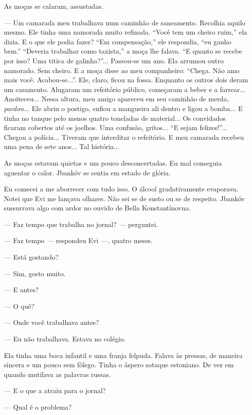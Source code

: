 As moças se calaram, assustadas.

\emph{---} Um camarada meu trabalhava num caminhão de saneamento.
Recolhia aquilo mesmo. Ele tinha uma namorada muito refinada. ``Você tem
um cheiro ruim,'' ela dizia. E o que ele podia fazer? ``Em
compensação,'' ele respondia, ``eu ganho bem.'' ``Deveria trabalhar como
taxista,'' a moça lhe falava. ``E quanto se recebe por isso? Uma titica
de galinha?''... Passou-se um ano. Ela arrumou outro namorado. Sem
cheiro. E a moça disse ao meu companheiro: ``Chega. Não amo mais você.
Acabou-se...''. Ele, claro, ficou na fossa. Enquanto os outros dois
deram um casamento. Alugaram um refeitório público, começaram a beber e
a farrear... Anoiteceu... Nessa altura, meu amigo apareceu em seu
caminhão de merda, \emph{pardon}... Ele abriu o postigo, enfiou a
mangueira ali dentro e ligou a bomba... E tinha no tanque pelo menos
quatro toneladas de material... Os convidados ficaram cobertos até os
joelhos. Uma confusão, gritos... ``E sejam felizes!''... Chegou a
polícia... Tiveram que interditar o refeitório. E meu camarada recebeu
uma pena de sete anos... Tal história...

As moças estavam quietas e um pouco desconcertadas. Eu mal conseguia
aguentar o calor. Jbankóv se sentia em estado de glória.

Eu comecei a me aborrecer com tudo isso. O álcool gradativamente
evaporava. Notei que Evi me lançava olhares. Não sei se de susto ou se
de respeito. Jbankóv sussurrava algo com ardor no ouvido de Bella
Konstantínovna.

\emph{---} Faz tempo que trabalha no jornal? \emph{---} perguntei.

\emph{---} Faz tempo \emph{---} respondeu Evi \emph{---}, quatro meses.

\emph{---} Está gostando?

\emph{---} Sim, gosto muito.

\emph{---} E antes?

\emph{---} O quê?

\emph{---} Onde você trabalhava antes?

\emph{---} Eu não trabalhava. Estava no colégio.

Ela tinha uma boca infantil e uma franja felpuda. Falava às pressas, de
maneira sincera e um pouco sem fôlego. Tinha o áspero sotaque estoniano.
De vez em quando mutilava as palavras russas.

\emph{---} E o que a atraiu para o jornal?

\emph{---} Qual é o problema?


